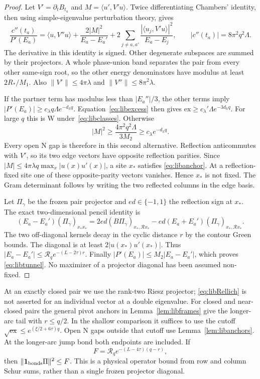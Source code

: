 \begin{proof}
Let $V'=\partial_t B_{t_a}$ and
$M=\langle u',V'u\rangle$. Twice differentiating Chambers' identity,
then using simple-eigenvalue perturbation theory, gives
\begin{equation}\label{eq:libRellich}
 \frac{c''(t_a)}{P'(E_a)}=
 \langle u,V''u\rangle+
 \frac{2|M|^2}{E_a-E_a'}+
 2\sum_{j\ne a,a'}\frac{|\langle u_j,V'u\rangle|^2}{E_a-E_j},
 \qquad |c''(t_a)|=8\pi^2q^2\Lambda.
\end{equation}
The derivative in this identity is signed. Other degenerate
subspaces are summed by their projectors. A whole phase-union band
separates the pair from every other same-sign root, so the other
energy denominators have modulus at least $2R_*/M_1$.
Also $\|V'\|\le4\pi\lambda$ and $\|V''\|\le8\pi^2\lambda$.

If the partner term has modulus less than $|E_a''|/3$, the other
terms imply $|P'(E_a)|\ge c_\lambda q\Lambda e^{-d_hq}$.
Equation~\eqref{eq:libexcess} then gives
$\mathrm{ex}\ge c_\lambda'\Lambda e^{-3d_hq}$.
For large $q$ this is W under~\eqref{eq:libclasses}.
Otherwise
\[
 |M|^2\ge \frac{4\pi^2q^2\Lambda}{3M_2}
       \ge c_\lambda e^{-d_hq}.
\]
Every open N gap is therefore in this second alternative.
Reflection anticommutes with $V'$, so its two edge vectors have
opposite reflection parities. Since
$|M|\le4\pi\lambda q\max_x|u(x)u'(x)|$, a site $x_*$ satisfies
\eqref{eq:libanchor}. At a reflection-fixed site one of these
opposite-parity vectors vanishes. Hence $x_*$ is not fixed.
The Gram determinant follows by writing the two reflected columns
in the edge basis.

Let $\Pi_\gamma$ be the frozen pair projector and $ed\in\{-1,1\}$
the reflection sign at $x_*$. The exact two-dimensional pencil
identity is
\[
 (E_a-E_a')(\Pi_\gamma)_{x_*x_*}
 =2ed(B\Pi_\gamma)_{x_*,\mathcal Rx_*}
   -ed(E_a+E_a')(\Pi_\gamma)_{x_*,\mathcal Rx_*}.
\]
The two off-diagonal kernels decay in the cyclic distance $r$ by
the contour Green bounds. The diagonal is at least
$2|u(x_*)u'(x_*)|$. Thus
$|E_a-E_a'|\le\mathcal R_q e^{-(L-2\tau)r}$.
Finally $|P'(E_a)|\le M_2|E_a-E_a'|$, which proves
\eqref{eq:libtunnel}. No maximizer of a projector diagonal has been
assumed non-fixed.
\end{proof}

At an exactly closed pair we use the rank-two Riesz projector;
\eqref{eq:libRellich} is not asserted for an individual vector at a
double eigenvalue. For closed and near-closed pairs the general
pivot anchors in Lemma~\ref{lem:libframes} give the longer-arc tail
with $r\le q/2$. In the shallow comparison it suffices to use the
cutoff $\sqrt{\mathrm{ex}}\le e^{(\xi/2+6\tau)q}$.
Open N gaps outside that cutoff use Lemma~\ref{lem:libanchors}.
At the longer-arc jump bond both endpoints are included. If
\begin{equation}\label{eq:libF}
 F=\mathcal R_q e^{-(L-4\tau)(q-r)},
\end{equation}
then $\|\mathbf 1_{\rm bonds}\Pi\|^2\le F$.
This is a physical operator bound from row and column Schur sums,
rather than a single frozen projector diagonal.

